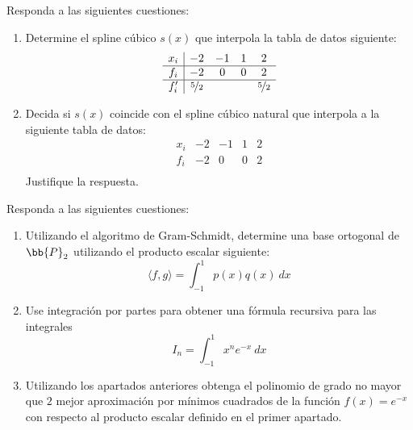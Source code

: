 \documentclass[12pt]{article}
\begin{document}
    \begin{ejercicio}
        Responda a las siguientes cuestiones:
        \begin{enumerate}
            \item Determine el spline cúbico $s(x)$ que interpola la tabla de datos siguiente:
            \begin{equation*}
                \begin{array}{c|cccc}
                    x_i & -2 & -1 & 1 & 2\\
                    \hline
                    f_i & -2 & 0 & 0 & 2\\
                    \hline
                    f_i' & \nicefrac{5}{2} &  &  & \nicefrac{5}{2}
                \end{array}
            \end{equation*}

            \item Decida si $s(x)$ coincide con el spline cúbico natural que interpola a la siguiente tabla de datos:
            \begin{equation*}
                \begin{array}{c|cccc}
                    x_i & -2 & -1 & 1 & 2\\
                    \hline
                    f_i & -2 & 0 & 0 & 2\\
                \end{array}
            \end{equation*}
            Justifique la respuesta.
        \end{enumerate}
    \end{ejercicio}


    \begin{ejercicio}
        Responda a las siguientes cuestiones:
        \begin{enumerate}
            \item Utilizando el algoritmo de Gram-Schmidt, determine una base ortogonal de $\bb{P}_2$ utilizando el producto escalar siguiente:
            \begin{equation*}
                \langle f,g\rangle=\int_{-1}^{1}p(x)q(x)~dx
            \end{equation*}

            \item Use integración por partes para obtener una fórmula recursiva para las integrales
            \begin{equation*}
                I_n = \int_{-1}^{1}x^n e^{-x}~dx
            \end{equation*}

            \item Utilizando los apartados anteriores obtenga el polinomio de grado no mayor que $2$ mejor aproximación por mínimos cuadrados de la función $f(x)=e^{-x}$
            con respecto al producto escalar definido en el primer apartado.
        \end{enumerate}
    \end{ejercicio}
\end{document}
